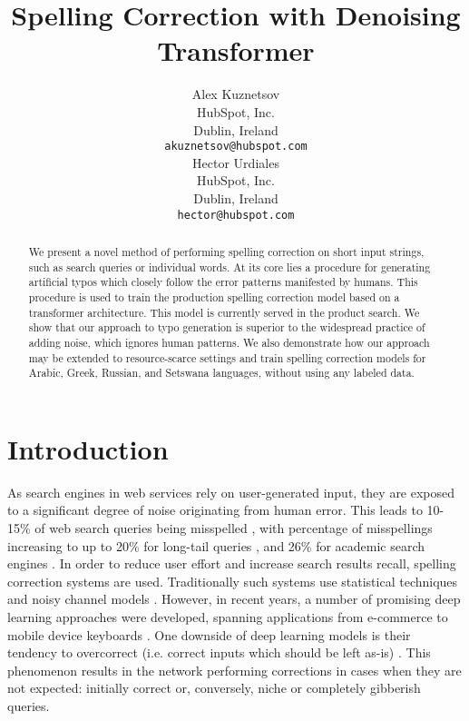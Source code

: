 \documentclass[11pt,a4paper]{article}
\title{Spelling Correction with Denoising Transformer}
\author{Alex Kuznetsov \\
  HubSpot, Inc. \\
  Dublin, Ireland \\
  \texttt{akuznetsov@hubspot.com} \\\And
  Hector Urdiales \\
  HubSpot, Inc. \\
  Dublin, Ireland \\
  \texttt{hector@hubspot.com} \\}
\date{}
\begin{document}
\maketitle
\begin{abstract}
We present a novel method of performing spelling correction on short input strings, such as search queries or individual words. At its core lies a procedure for generating artificial typos which closely follow the error patterns manifested by humans. This procedure is used to train the production spelling correction model based on a transformer architecture. This model is currently served in the {\fi} product search. We show that our approach to typo generation is superior to the widespread practice of adding noise, which ignores human patterns. We also demonstrate how our approach may be extended to resource-scarce settings and train spelling correction models for Arabic, Greek, Russian, and Setswana languages, without using any labeled data.
\end{abstract}


\section{Introduction}

As search engines in web services rely on user-generated input, they are exposed to a significant degree of noise originating from human error. This leads to 10-15\% of web search queries being misspelled \cite{Dalianis2002,Cucerzan2004}, with percentage of misspellings increasing to up to 20\% for long-tail queries \cite{Broder2009}, and 26\% for academic search engines \cite{Wang2003}. In order to reduce user effort and increase search results recall, spelling correction systems are used. Traditionally such systems use statistical techniques and noisy channel models \cite{Bassil2012,hasan2015spelling,eger2016comparison,gupta2019personalized}. However, in recent years, a number of promising deep learning approaches were developed, spanning applications from e-commerce \cite{zhou2017spelling} to mobile device keyboards \cite{ghosh2017neural}. One downside of deep learning models is their tendency to overcorrect (i.e. correct inputs which should be left as-is) \cite{movin2018spelling,Zhu2019}. This phenomenon results in the network performing corrections in cases when they are not expected: initially correct or, conversely, niche or completely gibberish queries.
\end{document}
